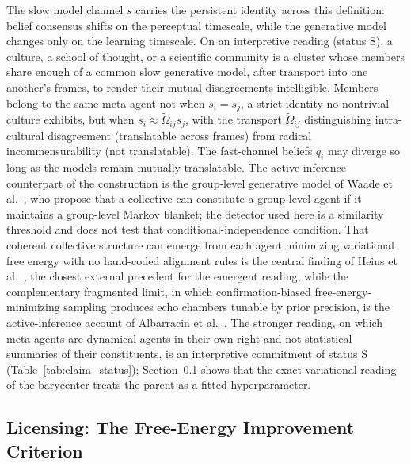 The slow model channel $s$ carries the persistent identity across this definition: belief consensus shifts on the perceptual timescale, while the generative model changes only on the learning timescale. On an interpretive reading (status S), a culture, a school of thought, or a scientific community is a cluster whose members share enough of a common slow generative model, after transport into one another's frames, to render their mutual disagreements intelligible. Members belong to the same meta-agent not when $s_i = s_j$, a strict identity no nontrivial culture exhibits, but when $s_i \approx \tilde\Omega_{ij} s_j$, with the transport $\tilde\Omega_{ij}$ distinguishing intra-cultural disagreement (translatable across frames) from radical incommensurability (not translatable). The fast-channel beliefs $q_i$ may diverge so long as the models remain mutually translatable. The active-inference counterpart of the construction is the group-level generative model of Waade et al.~\cite{waade2025asone}, who propose that a collective can constitute a group-level agent if it maintains a group-level Markov blanket; the detector used here is a similarity threshold and does not test that conditional-independence condition. That coherent collective structure can emerge from each agent minimizing variational free energy with no hand-coded alignment rules is the central finding of Heins et al.~\cite{heins2024collective}, the closest external precedent for the emergent reading, while the complementary fragmented limit, in which confirmation-biased free-energy-minimizing sampling produces echo chambers tunable by prior precision, is the active-inference account of Albarracin et al.~\cite{albarracin2022epistemic}. The stronger reading, on which meta-agents are dynamical agents in their own right and not statistical summaries of their constituents, is an interpretive commitment of status S (Table~\ref{tab:claim_status}); Section~\ref{sec:meta_agent_variational} shows that the exact variational reading of the barycenter treats the parent as a fitted hyperparameter.

\subsection{Licensing: The Free-Energy Improvement Criterion}
\label{sec:meta_agent_variational}

